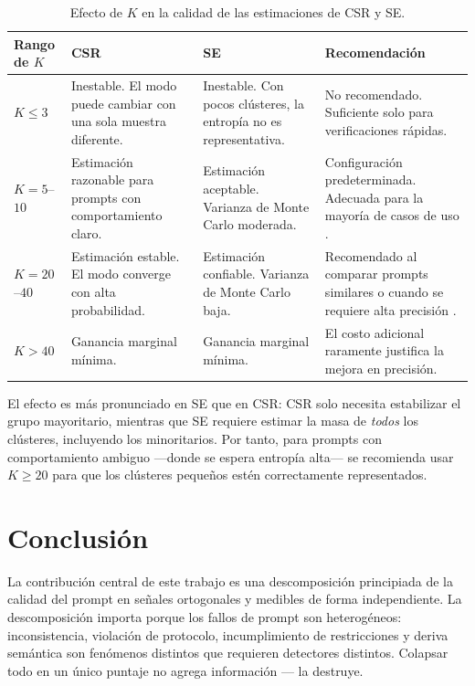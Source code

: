 \documentclass[11pt,a4paper]{article}
\begin{document}
\begin{table}[h]
\centering
\caption{Efecto de $K$ en la calidad de las estimaciones de CSR y SE.}
\label{tab:k}
\begin{tabular}{p{2cm} p{3.5cm} p{3.5cm} p{3.5cm}}
\toprule
Rango de $K$ & CSR & SE & Recomendación \\
\midrule
$K \leq 3$ &
Inestable. El modo puede cambiar con una sola muestra diferente. &
Inestable. Con pocos clústeres, la entropía no es representativa. &
No recomendado. Suficiente solo para verificaciones rápidas. \\
\addlinespace
$K = 5$--$10$ &
Estimación razonable para prompts con comportamiento claro. &
Estimación aceptable. Varianza de Monte Carlo moderada. &
Configuración predeterminada. Adecuada para la mayoría de casos de uso \citep{glape2024}. \\
\addlinespace
$K = 20$--$40$ &
Estimación estable. El modo converge con alta probabilidad. &
Estimación confiable. Varianza de Monte Carlo baja. &
Recomendado al comparar prompts similares o cuando se requiere alta precisión \citep{selfconsistency2023}. \\
\addlinespace
$K > 40$ &
Ganancia marginal mínima. &
Ganancia marginal mínima. &
El costo adicional raramente justifica la mejora en precisión. \\
\bottomrule
\end{tabular}
\end{table}

\noindent El efecto es más pronunciado en SE que en CSR: CSR solo necesita estabilizar el grupo mayoritario, mientras que SE requiere estimar la masa de \textit{todos} los clústeres, incluyendo los minoritarios. Por tanto, para prompts con comportamiento ambiguo ---donde se espera entropía alta--- se recomienda usar $K \geq 20$ para que los clústeres pequeños estén correctamente representados.

\section{Conclusión}

La contribución central de este trabajo es una descomposición principiada de la calidad del prompt en señales ortogonales y medibles de forma independiente. La descomposición importa porque los fallos de prompt son heterogéneos: inconsistencia, violación de protocolo, incumplimiento de restricciones y deriva semántica son fenómenos distintos que requieren detectores distintos. Colapsar todo en un único puntaje no agrega información --- la destruye.
\end{document}
